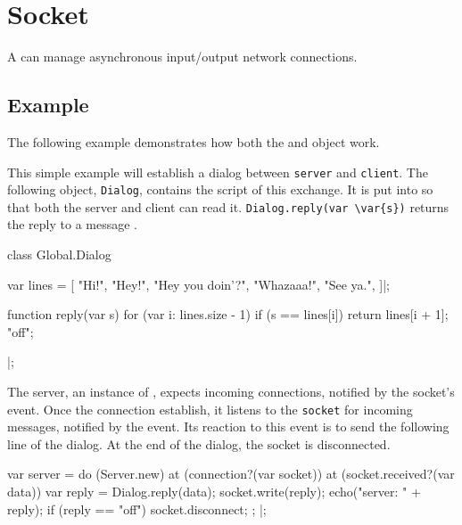 
\section{Socket}

A  can manage asynchronous input/output network connections.

\subsection{Example}

The following example demonstrates how both the  and
 object work.

This simple example will establish a dialog between \lstinline|server| and
\lstinline|client|.  The following object, \lstinline|Dialog|, contains the
script of this exchange.  It is put into  so that both the
server and client can read it.  \lstinline|Dialog.reply(var \var{s})|
returns the reply to a message .

\begin{urbiscript}
class Global.Dialog
{
  var lines =
  [
    "Hi!",
    "Hey!",
    "Hey you doin'?",
    "Whazaaa!",
    "See ya.",
  ]|;

  function reply(var s)
  {
    for (var i: lines.size - 1)
      if (s == lines[i])
        return lines[i + 1];
    "off";
  }
}|;
\end{urbiscript}

The server, an instance of , expects incoming connections,
notified by the socket's  event.  Once the connection
establish, it listens to the \lstinline|socket| for incoming messages,
notified by the  event.  Its reaction to this event is to
send the following line of the dialog.  At the end of the dialog, the socket
is disconnected.

\begin{urbiscript}
var server =
  do (Server.new)
  {
    at (connection?(var socket))
      at (socket.received?(var data))
      {
        var reply = Dialog.reply(data);
        socket.write(reply);
        echo("server: " + reply);
        if (reply == "off")
          socket.disconnect;
      };
  }|;
\end{urbiscript}

